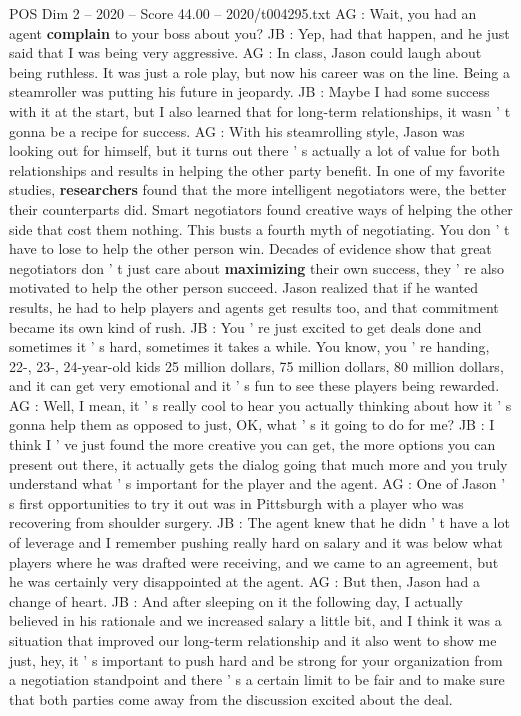 \begin{textsample}{POS Dim 2 – 2020 – Score 44.00 – 2020/t004295.txt}
AG : Wait, you had an agent \textbf{complain} to your boss about you?
JB : Yep, had that happen, and he just said that I was being very aggressive.
AG : In class, Jason could laugh about being ruthless.
It was just a role play, but now his career was on the line.
Being a steamroller was putting his future in jeopardy.
JB : Maybe I had some success with it at the start, but I also learned that for long-term relationships, it wasn ' t gonna be a recipe for success.
AG : With his steamrolling style, Jason was looking out for himself, but it turns out there ' s actually a lot of value for both relationships and results in helping the other party benefit.
In one of my favorite studies, \textbf{researchers} found that the more intelligent negotiators were, the better their counterparts did.
Smart negotiators found creative ways of helping the other side that cost them nothing.
This busts a fourth myth of negotiating.
You don ' t have to lose to help the other person win.
Decades of evidence show that great negotiators don ' t just care about \textbf{maximizing} their own success, they ' re also motivated to help the other person succeed.
Jason realized that if he wanted results, he had to help players and agents get results too, and that commitment became its own kind of rush.
JB : You ' re just excited to get deals done and sometimes it ' s hard, sometimes it takes a while.
You know, you ' re handing, 22-, 23-, 24-year-old kids 25 million dollars, 75 million dollars, 80 million dollars, and it can get very emotional and it ' s fun to see these players being rewarded.
AG : Well, I mean, it ' s really cool to hear you actually thinking about how it ' s gonna help them as opposed to just, OK, what ' s it going to do for me?
JB : I think I ' ve just found the more creative you can get, the more options you can present out there, it actually gets the dialog going that much more and you truly understand what ' s important for the player and the agent.
AG : One of Jason ' s first opportunities to try it out was in Pittsburgh with a player who was recovering from shoulder surgery.
JB : The agent knew that he didn ' t have a lot of leverage and I remember pushing really hard on salary and it was below what players where he was drafted were receiving, and we came to an agreement, but he was certainly very disappointed at the agent.
AG : But then, Jason had a change of heart.
JB : And after sleeping on it the following day, I actually believed in his rationale and we increased salary a little bit, and I think it was a situation that improved our long-term relationship and it also went to show me just, hey, it ' s important to push hard and be strong for your organization from a negotiation standpoint and there ' s a certain limit to be fair and to make sure that both parties come away from the discussion excited about the deal.

\end{textsample}
